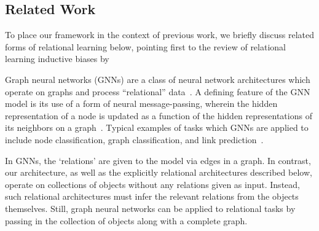 \subsection{Related Work}


To place our framework in the context of previous work, we briefly discuss  
related forms of relational learning below, pointing first to the review of relational learning inductive biases by ~\cite{battagliaRelationalInductiveBiases2018}%

{Graph neural networks} (GNNs) are a class of neural network architectures which operate on graphs and process ``relational'' data~\citep{niepertLearningConvolutionalNeural2016,kipfSemiSupervisedClassificationGraph2017,schlichtkrullModelingRelationalData2017,velickovicGraphAttentionNetworks2017,kipfNeuralRelationalInference2018,xuHowPowerfulAre2018}. A defining feature of the GNN model is its use of a form of neural message-passing, wherein the hidden representation of a node is updated as a function of the hidden representations of its neighbors on a graph~\citep{gilmerNeuralMessagePassing2017}. Typical examples of tasks which GNNs are applied to include node classification, graph classification, and link prediction~\citep{hamiltonGraphRepresentationLearning2020}. %

In GNNs, the `relations' are given to the model via edges in a graph. In contrast, our architecture, as well as the explicitly relational architectures described below, operate on collections of objects without any relations given as input. Instead, such relational architectures must infer the relevant relations from the objects themselves. Still, graph neural networks can be applied to relational tasks by passing in the collection of objects along with a complete graph. %

